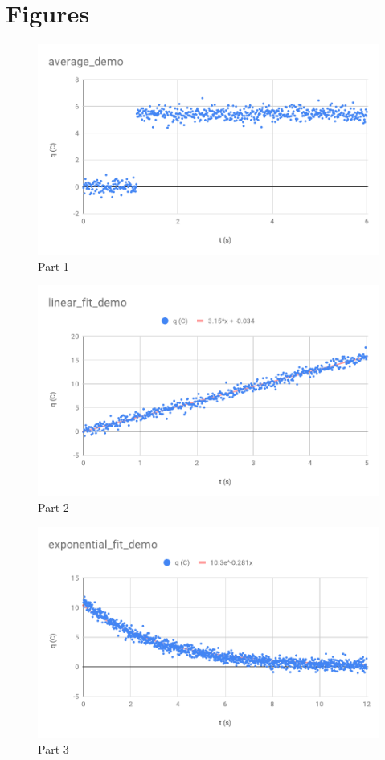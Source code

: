 \section{Figures}
\begin{figure}[ht]
    \includegraphics[scale=0.98]{image/00-review/average_demo.pdf}
    \caption{Part 1}
    \label{figure_00_average}
\end{figure}
\begin{figure}[ht]
    \includegraphics[scale=0.98]{image/00-review/linear_fit_demo.pdf}
    \caption{Part 2}
    \label{figure_00_linear}
\end{figure}
\begin{figure}[ht]
    \includegraphics[scale=0.98]{image/00-review/exponential_fit_demo.pdf}
    \caption{Part 3}
    \label{figure_00_exponential}
\end{figure}
